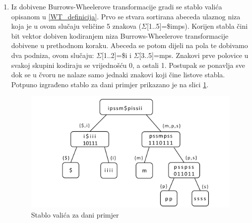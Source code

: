 \documentclass[11pt]{article}
\begin{document}
\begin{enumerate}
\item Iz dobivene Burrows-Wheelerove transformacije gradi se stablo valića opisanom u \ref{WT_definicija}. Prvo se stvara sortirana abeceda ulaznog niza koja je u ovom slučaju veličine 5 znakova ($\Sigma$[1..5]=\$imps). Korijen stabla čini bit vektor dobiven kodiranjem niza Burrows-Wheelerove transformacije dobivene u prethodnom koraku. Abeceda se potom dijeli na pola te dobivamo dva podniza, ovom slučaju: $\Sigma$[1..2]=\$i i $\Sigma$[3..5]=mps. Znakovi prve polovice u svakoj skupini kodiraju se vrijednošću 0, a ostali 1. Postupak se ponavlja sve dok se u čvoru ne nalaze samo jednaki znakovi koji čine listove stabla. Potpuno izgrađeno stablo za dani primjer prikazano je na slici \ref{fig:waveletTree}.

\begin{figure}
	\begin{center}
		\includegraphics[width=\columnwidth]{waveletTree.png}
		\caption{Stablo valića za dani primjer}
		\label{fig:waveletTree}
	\end{center}
\end{figure}


\end{enumerate}
\end{document}
